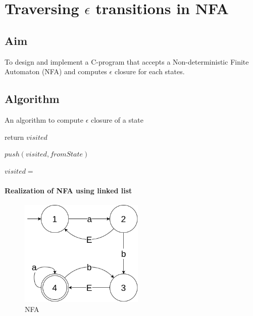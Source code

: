 \clearpage
\chapter{Traversing $\epsilon$ transitions in NFA}

\section{Aim}
To design and implement a C-program that accepts a Non-deterministic Finite Automaton (NFA) and computes $\epsilon$ closure for each states.

\section{Algorithm}

\begin{algorithm}[H]
	\caption{An algorithm to compute $\epsilon$ closure of a state}
	\begin{algorithmic}
		\State {}
		\State {}
		
		\State return $visited$
		\EndIf
		
		\State $push(visited, fromState)$
		
		\State $visited = $ 
		\EndIf
		\EndFor
		\EndProcedure
	\end{algorithmic}
\end{algorithm}

\subsubsection*{Realization of NFA using linked list}

\begin{figure}[H]
	\centering
	\includegraphics[height=2in]{../EXP4/NFA_realization-NFA.png}
	\caption{NFA}
\end{figure}

